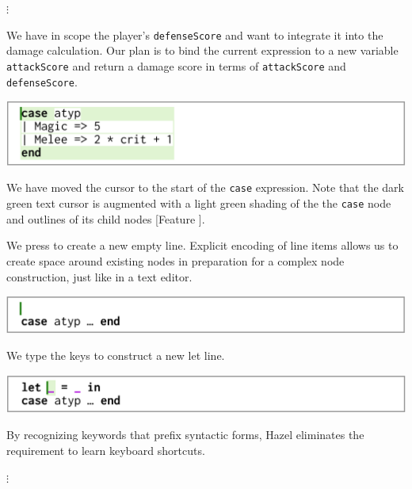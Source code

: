 \documentclass[format=sigplan,dvipsnames,backend=bibtex]{acmart}
\newcommand{\Hazel}{\textsf{Hazel}\xspace}
\newcommand{\key}[1]{\fbox{\texttt{#1}}}
\begin{document}
{\centering
	\vspace{-0.1cm}
  $\vdots$\par
  \vspace{0.1cm}
}
\noindent
We have in scope the player's \texttt{defenseScore}
	and want to integrate it into the damage calculation.
Our plan is to bind the current expression to a new variable \texttt{attackScore}
	and return a damage score in terms of \texttt{attackScore} and \texttt{defenseScore}.

{\centering
  \includegraphics[width=\linewidth]{fig/frame3.png}\par
}
\noindent
We have moved the cursor to the start of the \texttt{case} expression.
Note that the dark green text cursor is augmented with a light green shading of the
	the \texttt{case} node and outlines of its child nodes [Feature ].
	
We press \key{Enter} to create a new empty line.
Explicit encoding of line items allows us to create space around existing nodes
	in preparation for a complex node construction, just like in a text editor.

{\centering
  \includegraphics[width=\linewidth]{fig/frame4.png}\par
}
\noindent
We type the keys \key{l} \key{e} \key{t} \key{Space} to construct a new let line.

{\centering
  \includegraphics[width=\linewidth]{fig/frame5.png}\par
}
\noindent
By recognizing keywords that prefix syntactic forms, \Hazel eliminates the requirement
	to learn keyboard shortcuts.

{\centering
	\vspace{-0.1cm}
  $\vdots$\par
  \vspace{0.1cm}
}
\noindent
\end{document}
